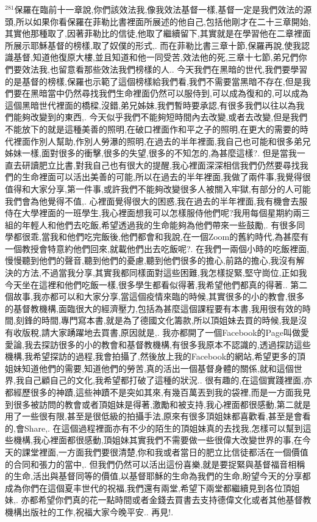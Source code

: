 \documentclass{book}
\begin{document}
$^{281}$保羅在臨前十一章說,你們該效法我,像我效法基督一樣,基督一定是我們效法的源頭,所以如果你看保羅在菲勒比書裡面所展述的他自己,包括他剛才在二十三章開始,其實他那種取了,因著菲勒比的信徒,他取了繼續留下,其實就是在學習他在二章裡面所展示耶穌基督的榜樣,取了奴僕的形式,.
而在菲勒比書三章十節,保羅再說,使我認識基督,知道他復原大樓,並且知道和他一同受苦,效法他的死,三章十七節,弟兄們你們要效法我,也留意看那些效法我們榜樣的人..
今天我們在黑暗的世代,我們要學習的是基督的榜樣,保羅也示範了這個榜樣給我們看,我們不需要當黑暗不存在,但是我們要在黑暗當中仍然尋找我們生命裡面仍然可以服侍到,可以成為復和的,可以成為這個黑暗世代裡面的橋樑,沒錯,弟兄姊妹,我們暫時要承認,有很多我們以往以為我們能夠改變到的東西,.
今天似乎我們不能夠短時間內去改變,或者去改變,但是我們不能放下的就是這種美善的照明,在破口裡面作和平之子的照明,在更大的需要的時代裡面作別人幫助,作別人勞瀑的照明,在過去的半年裡面,我自己也可能和很多弟兄姊妹一樣,面對很多的衝擊,很多的失望,很多的不知怎的,為甚麼這樣?.
但是當我一直去研讀肥立比書,對我自己也有很大的提醒,我心裡面深深相信我們仍然要尋找我們的生命裡面可以活出美善的可能,所以在過去的半年裡面,我做了兩件事,我覺得很值得和大家分享,第一件事,或許我們不能夠改變很多人被關入牢獄,有部分的人可能我們會為他覺得不值,.
心裡面覺得很大的困惑,我在過去的半年裡面,我有機會去服侍在大學裡面的一班學生,我心裡面想我可以怎樣服侍他們呢?我用每個星期約兩三組的年輕人和他們去吃飯,希望透過我的生命能夠為他們帶來一些鼓勵,.
有很多同學都很乖,當我和他們吃完飯後,他們都會和我說,在一個Zoom的舊約時代,為甚麼有一個教授會特意約他們回來,就載他們出去吃飯呢?.
在我們一兩個小時的吃飯裡面,慢慢聽到他們的聲音,聽到他們的憂慮,聽到他們很多的擔心,前路的擔心,我沒有解決的方法,不過當我分享,其實我都同樣面對這些困難,我怎樣捉緊,堅守崗位,正如我今天坐在這裡和他們吃飯一樣,很多學生都看似得著,我希望他們都真的得著..
第二個故事,我亦都可以和大家分享,當這個疫情來臨的時候,其實很多的小的教會,很多的基督教機構,面臨很大的經濟壓力,包括為甚麼這個課程要有本書,我用很有效的時間,刻鋒的時間,專門寫本書,就是為了德國文化籌款,所以頂姐妹去買的時候,我是沒有收版稅,請大家踴躍地去買書,原因就是,.
我亦都開了一個Facebook的Page叫做愛愛論,我去探訪很多的小的教會和基督教機構,有很多我原本不認識的,透過探訪這些機構,我希望探訪的過程,我會拍攝了,然後放上我的Facebook的網站,希望更多的頂姐妹知道他們的需要,知道他們的勞苦,真的活出一個基督身體的關係,就和這個世界,我自己顧自己的文化,我希望都打破了這種的狀況..
很有趣的,在這個實踐裡面,亦都經歷很多的神蹟,這些神蹟不是突如其來,有幾百萬丟到我的袋裡,而是一方面我見到很多被訪問的教會或者頂姐妹是得著,激勵和被支持,我心裡面都很感動,第二就是用了一些很有限,甚至是很低級的拍攝手法,原來有很多頂姐妹都喜歡看,甚至是會看的,會Share,.
在這個過程裡面亦有不少的陌生的頂姐妹真的去找我,怎樣可以幫到這些機構,我心裡面都很感動,頂姐妹其實我們不需要做一些很偉大改變世界的事,在今天的課堂裡面,一方面我們要很清楚,你和我或者當日的肥立比信徒都活在一個價值的合同和張力的當中,.
但我們仍然可以活出這份喜樂,就是要捉緊與基督福音相稱的生命,活出與基督同等的價值,以基督耶穌的生命為我們的生命,盼望今天的分享都成為你們在這個夏丰世代的祝福,我們還有兩堂,希望下兩堂都繼續見到各位頂姐妹,.
亦都希望你們真的花一點時間或者金錢去買書去支持德偉文化或者其他基督教機構出版社的工作,祝福大家今晚平安..
再見!.
\newpage
\end{document}
